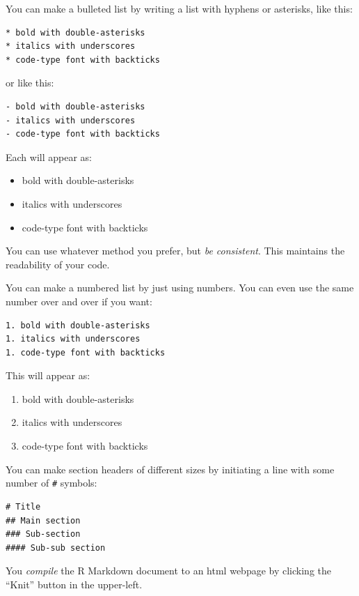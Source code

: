 \documentclass[]{book}
\providecommand{\tightlist}{%
  \setlength{\itemsep}{0pt}\setlength{\parskip}{0pt}}
\begin{document}
You can make a bulleted list by writing a list with hyphens or
asterisks, like this:

\begin{verbatim}
* bold with double-asterisks
* italics with underscores
* code-type font with backticks
\end{verbatim}

or like this:

\begin{verbatim}
- bold with double-asterisks
- italics with underscores
- code-type font with backticks
\end{verbatim}

Each will appear as:

\begin{itemize}
\tightlist
\item
  bold with double-asterisks
\item
  italics with underscores
\item
  code-type font with backticks
\end{itemize}

You can use whatever method you prefer, but \emph{be consistent}. This
maintains the readability of your code.

You can make a numbered list by just using numbers. You can even use the
same number over and over if you want:

\begin{verbatim}
1. bold with double-asterisks
1. italics with underscores
1. code-type font with backticks
\end{verbatim}

This will appear as:

\begin{enumerate}
\def\labelenumi{\arabic{enumi}.}
\tightlist
\item
  bold with double-asterisks
\item
  italics with underscores
\item
  code-type font with backticks
\end{enumerate}

You can make section headers of different sizes by initiating a line
with some number of \texttt{\#} symbols:

\begin{verbatim}
# Title
## Main section
### Sub-section
#### Sub-sub section
\end{verbatim}

You \emph{compile} the R Markdown document to an html webpage by
clicking the ``Knit'' button in the upper-left.
\end{document}
